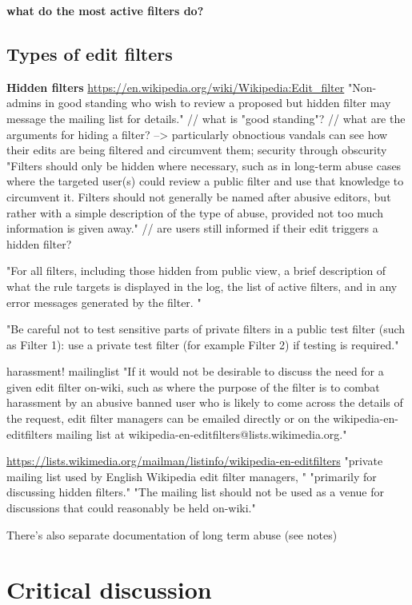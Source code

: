 \documentclass{sigchi}
\begin{document}
\textbf{what do the most active filters do?}

\subsection{Types of edit filters}

\textbf{Hidden filters}
\url{https://en.wikipedia.org/wiki/Wikipedia:Edit_filter}
"Non-admins in good standing who wish to review a proposed but hidden filter may message the mailing list for details."
// what is "good standing"?
// what are the arguments for hiding a filter? --> particularly obnoctious vandals can see how their edits are being filtered and circumvent them; security through obscurity
"Filters should only be hidden where necessary, such as in long-term abuse cases where the targeted user(s) could review a public filter and use that knowledge to circumvent it. Filters should not generally be named after abusive editors, but rather with a simple description of the type of abuse, provided not too much information is given away."
// are users still informed if their edit triggers a hidden filter?

"For all filters, including those hidden from public view, a brief description of what the rule targets is displayed in the log, the list of active filters, and in any error messages generated by the filter. "

"Be careful not to test sensitive parts of private filters in a public test filter (such as Filter 1): use a private test filter (for example Filter 2) if testing is required."

harassment! mailinglist
"If it would not be desirable to discuss the need for a given edit filter on-wiki, such as where the purpose of the filter is to combat harassment by an abusive banned user who is likely to come across the details of the request, edit filter managers can be emailed directly or on the wikipedia-en-editfilters mailing list at wikipedia-en-editfilters@lists.wikimedia.org."

\url{https://lists.wikimedia.org/mailman/listinfo/wikipedia-en-editfilters}
"private mailing list used by English Wikipedia edit filter managers, "
"primarily for discussing hidden filters."
"The mailing list should not be used as a venue for discussions that could reasonably be held on-wiki."

There's also separate documentation of long term abuse (see notes)


\section{Critical discussion}
\end{document}
